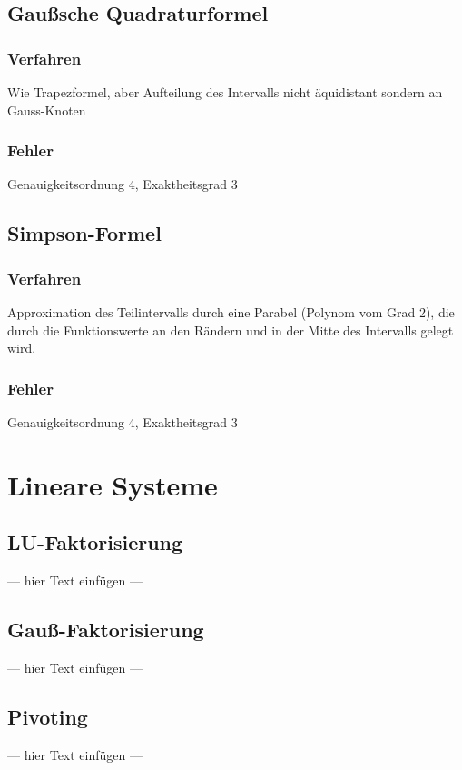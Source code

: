 \documentclass[a4paper, 12pt]{article}
\begin{document}
\begin{description}
\subsection{Gaußsche Quadraturformel}

\subsubsection*{Verfahren}
Wie Trapezformel, aber Aufteilung des Intervalls nicht äquidistant sondern an Gauss-Knoten

\subsubsection*{Fehler}
Genauigkeitsordnung 4, Exaktheitsgrad 3


\subsection{Simpson-Formel}

\subsubsection*{Verfahren}
Approximation des Teilintervalls durch eine Parabel (Polynom vom Grad 2), die durch die Funktionswerte an den Rändern und in der Mitte des Intervalls gelegt wird.

\subsubsection*{Fehler}
Genauigkeitsordnung 4, Exaktheitsgrad 3



\section{Lineare Systeme}


\subsection{LU-Faktorisierung}
--- hier Text einfügen ---


\subsection{Gauß-Faktorisierung}
--- hier Text einfügen ---


\subsection{Pivoting}
--- hier Text einfügen ---




\end{description}
\end{document}
